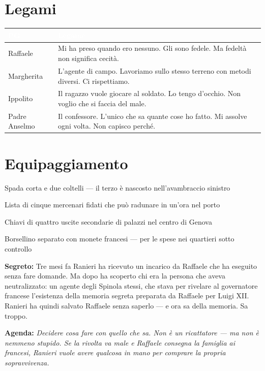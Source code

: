 \section*{Legami}

\begin{table}[h]
\centering\renewcommand{\arraystretch}{1.4}
\begin{tabularx}{\linewidth}{@{}L{2.6cm} X@{}}
  \toprule{}
  \textcolor{white}{\textbf{PG}} & \textcolor{white}{\textbf{Legame}} \\
  \midrule
  Raffaele & Mi ha preso quando ero nessuno. Gli sono fedele. Ma fedeltà non significa cecità. \\
  Margherita & L'agente di campo. Lavoriamo sullo stesso terreno con metodi diversi. Ci rispettiamo. \\
  Ippolito & Il ragazzo vuole giocare al soldato. Lo tengo d'occhio. Non voglio che si faccia del male. \\
  Padre Anselmo & Il confessore. L'unico che sa quante cose ho fatto. Mi assolve ogni volta. Non capisco perché. \\
  \bottomrule
\end{tabularx}
\end{table}

\section*{Equipaggiamento}
\begin{goldlist}
  \item Spada corta e due coltelli — il terzo è nascosto nell'avambraccio sinistro
  \item Lista di cinque mercenari fidati che può radunare in un'ora nel porto
  \item Chiavi di quattro uscite secondarie di palazzi nel centro di Genova
  \item Borsellino separato con monete francesi — per le spese nei quartieri sotto controllo
\end{goldlist}


\begin{secretbox}
  \textbf{Segreto:} Tre mesi fa Ranieri ha ricevuto un incarico da Raffaele che
  ha eseguito senza fare domande. Ma dopo ha scoperto chi era la persona che aveva
  neutralizzato: un agente degli Spinola stessi, che stava per rivelare al
  governatore francese l'esistenza della memoria segreta preparata da Raffaele
  per Luigi XII. Ranieri ha quindi salvato Raffaele senza saperlo — e ora sa
  della memoria. Sa troppo.

  \medskip\noindent\textcolor{SecretRed}{\textbf{Agenda:}}
  \textit{Decidere cosa fare con quello che sa. Non è un ricattatore — ma non
  è nemmeno stupido. Se la rivolta va male e Raffaele consegna la famiglia
  ai francesi, Ranieri vuole avere qualcosa in mano per comprare la propria
  sopravvivenza.}
\end{secretbox}


